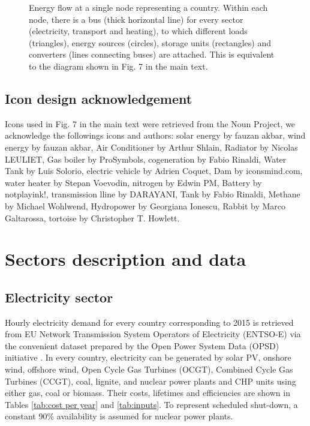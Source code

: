 \documentclass[3p]{elsarticle} %
\begin{document}
\begin{figure}[!t]
\begin{adjustbox}{scale=0.60,trim=5 6.8cm 0 0}
\begin{circuitikz}
  \end{circuitikz}

\end{adjustbox}
\caption{Energy flow at a single node representing a country. Within each node, there is a bus (thick horizontal line) for every sector (electricity, transport and heating), to which different loads (triangles), energy sources (circles), storage units (rectangles) and converters (lines connecting buses) are attached. This is equivalent to the diagram shown in Fig. 7 in the main text. }
\label{Fig_buses}
\end{figure}


\subsection{Icon design acknowledgement}
Icons used in Fig. 7 in the main text were retrieved from the Noun Project, we acknowledge the followings icons and authors: solar energy by fauzan akbar, wind energy by fauzan akbar, Air Conditioner by Arthur Shlain, Radiator by Nicolas LEULIET, Gas boiler by ProSymbols, cogeneration by Fabio Rinaldi, Water Tank by Luis Solorio, electric vehicle by Adrien Coquet, Dam by iconsmind.com, water heater by Stepan Voevodin, nitrogen by Edwin PM, Battery by notplayink!, transmission lline by DARAYANI, Tank by Fabio Rinaldi, Methane by Michael Wohlwend, Hydropower by Georgiana Ionescu, Rabbit by Marco Galtarossa, tortoise by Christopher T. Howlett.

\section{Sectors description and data}

\subsection{Electricity sector}
Hourly electricity demand for every country corresponding to 2015 is retrieved from EU Network Transmission System Operators of Electricity (ENTSO-E) via the convenient dataset prepared by the Open Power System Data (OPSD) initiative \cite{OPSD}. In every country, electricity can be generated by solar PV, onshore wind, offshore wind, Open Cycle Gas Turbines (OCGT), Combined Cycle Gas Turbines (CCGT), coal, lignite, and nuclear power plants and CHP units using either gas, coal or biomass. Their costs, lifetimes and efficiencies are shown in Tables \ref{tab:cost per year} and \ref{tab:inputs}.  To represent scheduled shut-down, a constant 90\% availability is assumed for nuclear power plants. \
\end{document}

